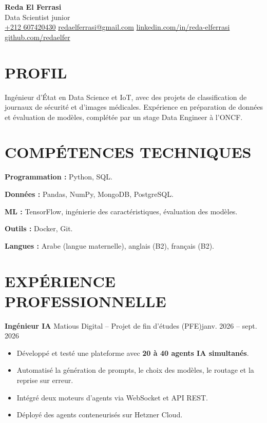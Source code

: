 \documentclass[11pt,a4paper]{article}
\newcommand{\entry}[2]{\noindent #1\hfill #2\par}
\begin{document}
\begin{center}
  {\LARGE\bfseries Reda El Ferrasi}\\[3pt]
  {\large Data Scientist junior}\\[5pt]
  {\small
    \href{tel:+212607420430}{+212 607420430}
    \enspace\textbar{}\enspace
    \href{mailto:redaelferrasi@gmail.com}{redaelferrasi@gmail.com}
    \enspace\textbar{}\enspace
    \href{https://www.linkedin.com/in/reda-elferrasi/}{linkedin.com/in/reda-elferrasi}
    \enspace\textbar{}\enspace
    \href{https://github.com/redaelfer}{github.com/redaelfer}
  }
\end{center}
\vspace{-5pt}


\section*{PROFIL}
Ingénieur d’État en Data Science et IoT, avec des projets de classification de journaux de sécurité et d’images médicales. Expérience en préparation de données et évaluation de modèles, complétée par un stage Data Engineer à l’ONCF.

\section*{COMPÉTENCES TECHNIQUES}
\textbf{Programmation :} Python, SQL.\par
\textbf{Données :} Pandas, NumPy, MongoDB, PostgreSQL.\par
\textbf{ML :} TensorFlow, ingénierie des caractéristiques, évaluation des modèles.\par
\textbf{Outils :} Docker, Git.\par
\textbf{Langues :} Arabe (langue maternelle), anglais (B2), français (B2).

\section*{EXPÉRIENCE PROFESSIONNELLE}

\entry{\textbf{Ingénieur IA} \textbar{} Matious Digital -- Projet de fin d'études (PFE)}{janv. 2026 -- sept. 2026}
\begin{itemize}
  \item Développé et testé une plateforme avec \textbf{20 à 40 agents IA simultanés}.
  \item Automatisé la génération de prompts, le choix des modèles, le routage et la reprise sur erreur.
  \item Intégré deux moteurs d'agents via WebSocket et API REST.
  \item Déployé des agents conteneurisés sur Hetzner Cloud.
\end{itemize}
\end{document}
